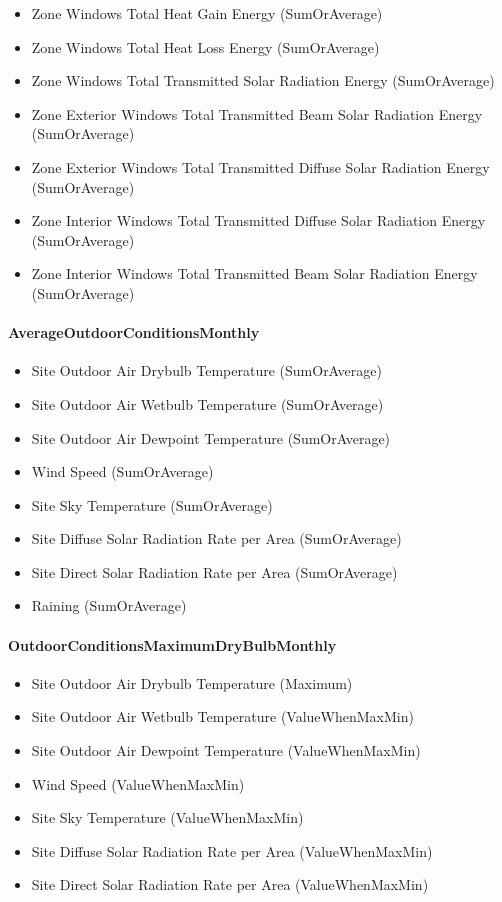 \begin{itemize}
\item
  Zone Windows Total Heat Gain Energy (SumOrAverage)
\item
  Zone Windows Total Heat Loss Energy (SumOrAverage)
\item
  Zone Windows Total Transmitted Solar Radiation Energy (SumOrAverage)
\item
  Zone Exterior Windows Total Transmitted Beam Solar Radiation Energy (SumOrAverage)
\item
  Zone Exterior Windows Total Transmitted Diffuse Solar Radiation Energy (SumOrAverage)
\item
  Zone Interior Windows Total Transmitted Diffuse Solar Radiation Energy (SumOrAverage)
\item
  Zone Interior Windows Total Transmitted Beam Solar Radiation Energy (SumOrAverage)
\end{itemize}

\paragraph{AverageOutdoorConditionsMonthly}\label{averageoutdoorconditionsmonthly}

\begin{itemize}
\item
  Site Outdoor Air Drybulb Temperature (SumOrAverage)
\item
  Site Outdoor Air Wetbulb Temperature (SumOrAverage)
\item
  Site Outdoor Air Dewpoint Temperature (SumOrAverage)
\item
  Wind Speed (SumOrAverage)
\item
  Site Sky Temperature (SumOrAverage)
\item
  Site Diffuse Solar Radiation Rate per Area (SumOrAverage)
\item
  Site Direct Solar Radiation Rate per Area (SumOrAverage)
\item
  Raining (SumOrAverage)
\end{itemize}

\paragraph{OutdoorConditionsMaximumDryBulbMonthly}\label{outdoorconditionsmaximumdrybulbmonthly}

\begin{itemize}
\item
  Site Outdoor Air Drybulb Temperature (Maximum)
\item
  Site Outdoor Air Wetbulb Temperature (ValueWhenMaxMin)
\item
  Site Outdoor Air Dewpoint Temperature (ValueWhenMaxMin)
\item
  Wind Speed (ValueWhenMaxMin)
\item
  Site Sky Temperature (ValueWhenMaxMin)
\item
  Site Diffuse Solar Radiation Rate per Area (ValueWhenMaxMin)
\item
  Site Direct Solar Radiation Rate per Area (ValueWhenMaxMin)
\end{itemize}

